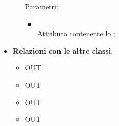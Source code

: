 \begin{itemize}
\begin{itemize}
		Parametri:
		\begin{itemize}
			\item {} \\
			Attributo contenente lo ;
		\end{itemize}
	\end{itemize}
	\item \textbf{Relazioni con le altre classi}:
	\begin{itemize}
		\item OUT \hyperlink{LambdaContext_label}{}
		\item OUT \hyperlink{LambdaIdEvent_label}{}
		\item OUT \hyperlink{<<interface>> UsersDAO_label}{}
		\item OUT \hyperlink{LambdaEvent_label}{}
	\end{itemize}
\end{itemize}
\FloatBarrier

